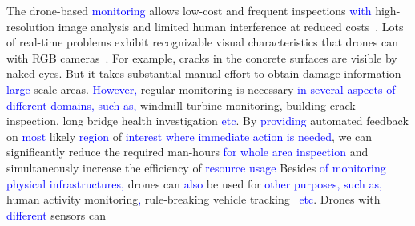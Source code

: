 The drone-based \textcolor{blue}{monitoring} allows low-cost and frequent inspections \textcolor{blue}{with} high-resolution image analysis and limited human interference
at reduced costs~\cite{morgenthal2014quality}. Lots of real-time problems exhibit recognizable visual characteristics that drones can  with RGB cameras~\cite{roy2013performance}. For example, cracks in the concrete 
surfaces are visible by naked eyes. But it takes substantial manual effort to obtain damage information  \textcolor{blue}{large} scale areas.
\textcolor{blue}{However,} 
regular monitoring is necessary \textcolor{blue}{in several aspects of different domains, such as,} 
windmill turbine monitoring, building crack inspection, long bridge health investigation \textcolor{blue}{etc}. By 
\textcolor{blue}{providing} 
automated feedback on 
\textcolor{blue}{most} likely 
\textcolor{blue}{region} of 
\textcolor{blue}{interest where immediate action is needed}, we can significantly reduce the required man-hours \textcolor{blue}{for whole area inspection} and simultaneously increase the efficiency of \textcolor{blue}{resource usage}
Besides \textcolor{blue}{of monitoring physical infrastructures,} 
drones can \textcolor{blue}{also} be used for \textcolor{blue}{other purposes, such as,} human 
activity monitoring\textcolor{blue}{,}  
rule-breaking vehicle tracking~\cite{ngo2019isir} \textcolor{blue}{etc}. Drones with 
\textcolor{blue}{different} sensors can 
